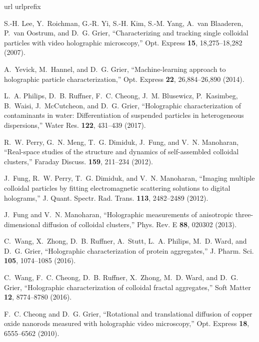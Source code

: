 \documentclass[10pt,letterpaper]{article}
\begin{document}
\begin{thebibliography}{10}
\newcommand{\enquote}[1]{``#1''}
\expandafter\ifx\csname url\endcsname\relax
  \def\url#1{\texttt{#1}}\fi
\expandafter\ifx\csname urlprefix\endcsname\relax\def\urlprefix{URL }\fi
\providecommand{\eprint}[2][]{\url{#2}}

S.-H. Lee, Y.~Roichman, G.-R. Yi, S.-H. Kim, S.-M. Yang, A.~van Blaaderen,
  P.~van Oostrum, and D.~G. Grier, \enquote{Characterizing and tracking single
  colloidal particles with video holographic microscopy,} Opt. Express
  \textbf{15}, 18,275--18,282 (2007).

A.~Yevick, M.~Hannel, and D.~G. Grier, \enquote{Machine-learning approach to
  holographic particle characterization,} Opt. Express \textbf{22},
  26,884--26,890 (2014).

L.~A. Philips, D.~B. Ruffner, F.~C. Cheong, J.~M. Blusewicz, P.~Kasimbeg,
  B.~Waisi, J.~McCutcheon, and D.~G. Grier, \enquote{Holographic
  characterization of contaminants in water: Differentiation of suspended
  particles in heterogeneous dispersions,} Water Res. \textbf{122},
  431--439 (2017).

R.~W. Perry, G.~N. Meng, T.~G. Dimiduk, J.~Fung, and V.~N. Manoharan,
  \enquote{Real-space studies of the structure and dynamics of self-assembled
  colloidal clusters,} Faraday Discuss. \textbf{159}, 211--234 (2012).

J.~Fung, R.~W. Perry, T.~G. Dimiduk, and V.~N. Manoharan, \enquote{Imaging
  multiple colloidal particles by fitting electromagnetic scattering solutions
  to digital holograms,} J. Quant. Spectr. Rad. Trans. \textbf{113}, 2482--2489
  (2012).

J.~Fung and V.~N. Manoharan, \enquote{Holographic measurements of anisotropic
  three-dimensional diffusion of colloidal clusters,} Phys. Rev. E \textbf{88},
  020302 (2013).

C.~Wang, X.~Zhong, D.~B. Ruffner, A.~Stutt, L.~A. Philips, M.~D. Ward, and
  D.~G. Grier, \enquote{Holographic characterization of protein aggregates,} J.
  Pharm. Sci. \textbf{105}, 1074--1085 (2016).

C.~Wang, F.~C. Cheong, D.~B. Ruffner, X.~Zhong, M.~D. Ward, and D.~G. Grier,
  \enquote{Holographic characterization of colloidal fractal aggregates,} Soft
  Matter \textbf{12}, 8774--8780 (2016).

F.~C. Cheong and D.~G. Grier, \enquote{Rotational and translational diffusion
  of copper oxide nanorods measured with holographic video microscopy,} Opt.
  Express \textbf{18}, 6555--6562 (2010).


\end{thebibliography}
\end{document}
